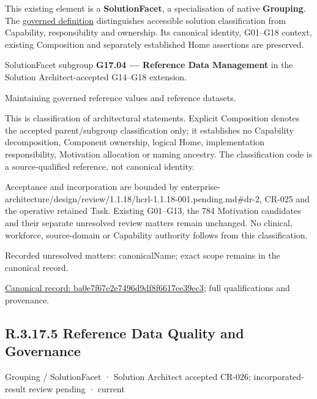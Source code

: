 This existing element is a \textbf{SolutionFacet}, a specialisation of native
\textbf{Grouping}. The \href{\detokenize{../../../../../../../governance/continuum-representation.md#solutionfacet-classification--1119-candidate}}{governed definition}
distinguishes accessible solution classification from Capability, responsibility
and ownership. Its canonical identity, G01–G18 context, existing Composition
and separately established Home assertions are preserved.



SolutionFacet subgroup \textbf{G17.04 — Reference Data Management} in the Solution Architect-accepted G14–G18 extension.



Maintaining governed reference values and reference datasets.



This is classification of architectural statements. Explicit Composition denotes the accepted parent/subgroup classification only; it establishes no Capability decomposition, Component ownership, logical Home, implementation responsibility, Motivation allocation or naming ancestry. The classification code is a source-qualified reference, not canonical identity.



Acceptance and incorporation are bounded by enterprise-architecture/design/review/1.1.18/hcrl-1.1.18-001.pending.md\#dr-2, CR-025 and the operative retained Task. Existing G01–G13, the 784 Motivation candidates and their separate unresolved review matters remain unchanged. No clinical, workforce, source-domain or Capability authority follows from this classification.


{\small Recorded unresolved matters: canonicalName; exact scope remains in the canonical record.}\par
{\footnotesize \href{../../../../../../../continuum/grouping/ba0e7f67e2e7496d9df8f6617ee39ec3.md}{Canonical record: ba0e7f67e2e7496d9df8f6617ee39ec3}; full qualifications and provenance.}\par
\subsection*{R.3.17.5 Reference Data Quality and Governance}
\label{navigation:R.3.17.5}

\label{element:400c5c54a23a44588cc473ed10ead4a8}
{\small Grouping / SolutionFacet · Solution Architect accepted CR-026; incorporated-result review pending · current}\par

